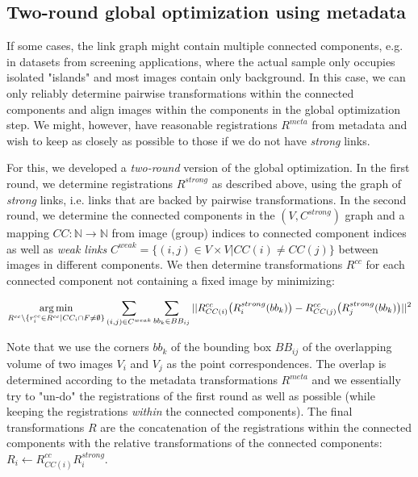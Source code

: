 \subsection*{Two-round global optimization using metadata}

If some cases, the link graph might contain multiple connected components, e.g. in datasets from screening applications, where the actual sample only occupies isolated "islands" and most images contain only background. In this case, we can only reliably determine pairwise transformations within the connected components and align images within the components in the global optimization step. We might, however, have reasonable registrations $R^{meta}$ from metadata and wish to keep as closely as possible to those if we do not have \emph{strong} links.

For this, we developed a \emph{two-round} version of the global optimization. In the first round, we determine registrations $R^{strong}$ as described above, using the graph of \emph{strong} links, i.e. links that are backed by pairwise transformations. In the second round, we determine the connected components in the $(V, C^{strong} )$ graph and a mapping $CC: \mathbb{N} \to \mathbb{N}$ from image (group) indices to  connected component indices as well as \emph{weak links} $C^{weak} = \{(i,j) \in V \times V | CC(i) \neq CC(j) \}$ between images in different components. We then determine transformations $R^{cc}$ for each connected component not containing a fixed image by minimizing:

\begin{equation}
\label{eq:globalopt-eq4}
\operatorname*{arg\,min}_{R^{cc} \setminus \{ r^{cc}_{i} \in R^{cc} | CC_i \cap F \neq \emptyset \}} \sum_{(i,j) \in C^{weak}} \sum_{bb_{k} \in BB_{ij}} || R^{cc}_{CC(i)}\big( R^{strong}_{i}( bb_{k})\big) -  R^{cc}_{CC(j)}\big( R^{strong}_{j}( bb_{k}) \big) ||^2 
\end{equation}

Note that we use the corners $bb_k$ of the bounding box $BB_{ij}$ of the overlapping volume of two images $V_i$ and $V_j$ as the point correspondences. The overlap is determined according to the metadata transformations $R^{meta}$ and we essentially try to "un-do" the registrations of the first round as well as possible (while keeping the registrations \emph{within} the connected components). The final transformations $R$ are the concatenation of the registrations within the connected components with the relative transformations of the connected components: $R_{i} \leftarrow R^{cc}_{CC(i)} R^{strong}_{i}$.


